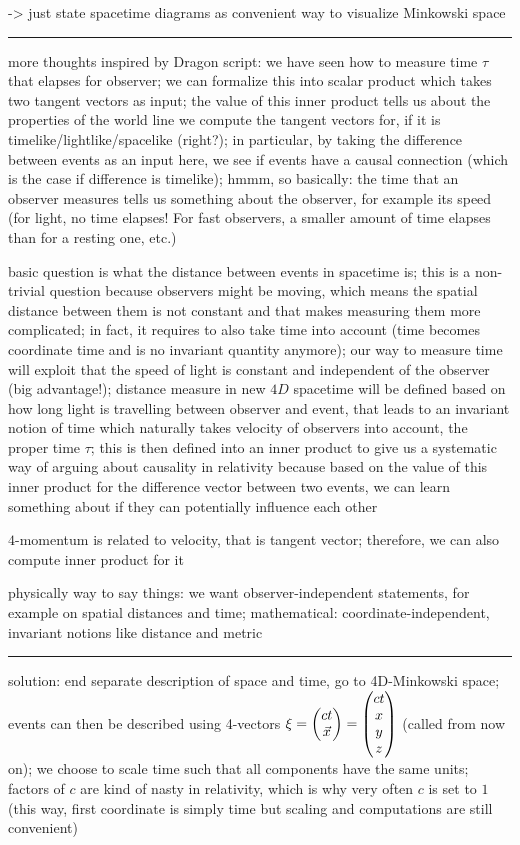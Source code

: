-> just state spacetime diagrams as convenient way to visualize Minkowski space

\hrule

more thoughts inspired by Dragon script: we have seen how to measure time $\tau$ that elapses for observer; we can formalize this into scalar product which takes two tangent vectors as input; the value of this inner product tells us about the properties of the world line we compute the tangent vectors for, if it is timelike/lightlike/spacelike (right?); in particular, by taking the difference between events as an input here, we see if events have a causal connection (which is the case if difference is timelike); hmmm, so basically: the time that an observer measures tells us something about the observer, for example its speed (for light, no time elapses! For fast observers, a smaller amount of time elapses than for a resting one, etc.)

basic question is what the distance between events in spacetime is; this is a non-trivial question because observers might be moving, which means the spatial distance between them is not constant and that makes measuring them more complicated; in fact, it requires to also take time into account (time becomes coordinate time and is no invariant quantity anymore); our way to measure time will exploit that the speed of light is constant and independent of the observer (big advantage!); distance measure in new $4D$ spacetime will be defined based on how long light is travelling between observer and event, that leads to an invariant notion of time which naturally takes velocity of observers into account, the proper time $\tau$; this is then defined into an inner product to give us a systematic way of arguing about causality in relativity because based on the value of this inner product for the difference vector between two events, we can learn something about if they can potentially influence each other


$4$-momentum is related to velocity, that is tangent vector; therefore, we can also compute inner product for it


physically way to say things: we want observer-independent statements, for example on spatial distances and time; mathematical: coordinate-independent, invariant notions like distance and metric


\hrule


solution: end separate description of space and time, go to 4D-Minkowski space; events can then be described using 4-vectors $\mathbf{\xi} = \mqty(c t \\ \vec{x}) = \mqty(c t \\ x \\ y \\ z)$ (called  from now on); we choose to scale time such that all components have the same units; factors of $c$ are kind of nasty in relativity, which is why very often $c$ is set to $1$ (this way, first coordinate is simply time but scaling and computations are still convenient)



